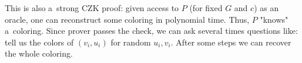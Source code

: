 \begin{remark}
    This is also a~strong $\mathrm{CZK}$ proof: given access to $P$ (for fixed $G$ and $c$) as an oracle, one can reconstruct some coloring in polynomial time.
    Thus, $P$ "knows" a~coloring.
    Since prover passes the check, we can ask several times questions like: tell us the colors of $(v_i, u_i)$ for random $u_i, v_i$.
    After some steps we can recover the whole coloring.
\end{remark}

